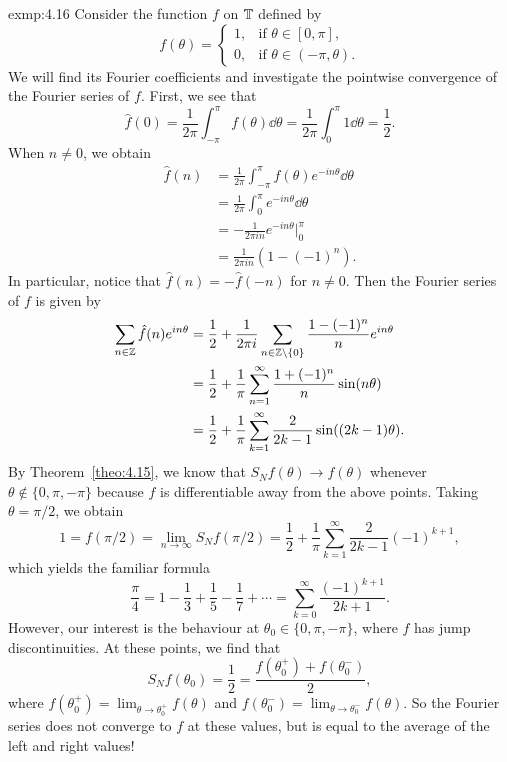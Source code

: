 \begin{exmp}{exmp:4.16}
    Consider the function $f$ on $\mathbb{T}$ defined by 
    \[ f(\theta) = \begin{cases}
        1, & \text{if } \theta \in [0, \pi], \\ 
        0, & \text{if } \theta \in (-\pi, \theta). 
    \end{cases} \] 
    We will find its Fourier coefficients and investigate the pointwise 
    convergence of the Fourier series of $f$. First, we see that 
    \[ \hat f(0) = \frac{1}{2\pi} \int_{-\pi}^\pi f(\theta)\dd\theta 
    = \frac{1}{2\pi} \int_0^\pi 1\dd\theta = \frac12. \] 
    When $n \neq 0$, we obtain 
    \begin{align*}
        \hat f(n) 
        &= \frac{1}{2\pi} \int_{-\pi}^\pi f(\theta) e^{-in\theta}\dd\theta \\
        &= \frac{1}{2\pi} \int_0^\pi e^{-in\theta}\dd\theta \\
        &= -\frac{1}{2\pi in} e^{-in\theta} \bigg|_0^\pi \\
        &= \frac{1}{2\pi in} (1 - (-1)^n).
    \end{align*}
    In particular, notice that $\hat f(n) = -\hat f(-n)$ for $n \neq 0$. Then 
    the Fourier series of $f$ is given by 
    \begin{align*}
        \sum_{n\in\mathbb{Z}} \hat f(n) e^{in\theta} 
        &= \frac12 + \frac{1}{2\pi i} \sum_{n\in\mathbb{Z}\setminus\{0\}} \frac{1 - (-1)^n}{n} e^{in\theta} \\ 
        &= \frac12 + \frac1\pi \sum_{n=1}^\infty \frac{1 + (-1)^n}n \sin(n\theta) \\ 
        &= \frac12 + \frac1\pi \sum_{k=1}^\infty \frac{2}{2k-1} \sin((2k-1)\theta).  
    \end{align*}
    By Theorem~\ref{theo:4.15}, we know that $S_Nf(\theta) \to f(\theta)$ 
    whenever $\theta \notin \{0, \pi, -\pi\}$ because $f$ is differentiable 
    away from the above points. Taking $\theta = \pi/2$, we obtain 
    \[ 1 = f(\pi/2) = \lim_{n\to\infty} S_Nf(\pi/2) = 
    \frac12 + \frac1\pi \sum_{k=1}^\infty \frac{2}{2k-1} (-1)^{k+1}, \] 
    which yields the familiar formula 
    \[ \frac{\pi}{4} = 1 - \frac13 + \frac15 - \frac17 + \cdots 
    = \sum_{k=0}^\infty \frac{(-1)^{k+1}}{2k+1}. \] 
    However, our interest is the behaviour at $\theta_0 \in \{0, \pi, -\pi\}$, 
    where $f$ has jump discontinuities. At these points, we find that 
    \[ S_N f(\theta_0) = \frac12 = \frac{f(\theta_0^+) + f(\theta_0^-)}{2}, \] 
    where $f(\theta_0^+) = \lim_{\theta\to\theta_0^+} f(\theta)$ 
    and $f(\theta_0^-) = \lim_{\theta\to\theta_0^-} f(\theta)$. So the 
    Fourier series does not converge to $f$ at these values, but is 
    equal to the average of the left and right values! 
\end{exmp}

